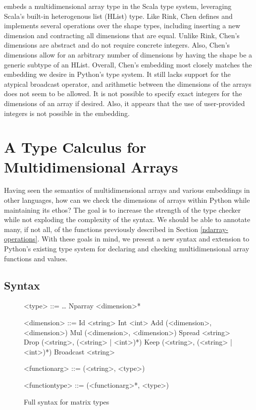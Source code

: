 \documentclass[12pt]{report}
\begin{document}
\cite{Chen2017TypesafeAF} embeds a multidimensional array type in the Scala type system, leveraging Scala's built-in heterogenous list (HList) type. Like Rink, Chen defines and implements several operations over the shape types, including inserting a new dimension and contracting all dimensions that are equal. Unlike Rink, Chen's dimensions are abstract and do not require concrete integers. Also, Chen's dimensions allow for an arbitrary number of dimensions by having the shape be a generic subtype of an HList. Overall, Chen's embedding most closely matches the embedding we desire in Python's type system. It still lacks support for the atypical broadcast operator, and arithmetic between the dimensions of the arrays does not seem to be allowed. It is not possible to specify exact integers for the dimensions of an array if desired. Also, it appears that the use of user-provided integers is not possible in the embedding.

\chapter{A Type Calculus for Multidimensional Arrays}

Having seen the semantics of multidimensional arrays and various embeddings in other languages, how can we check the dimensions of arrays within Python while maintaining its ethos? The goal is to increase the strength of the type checker while not exploding the complexity of the syntax. We should be able to annotate many, if not all, of the functions previously described in Section \ref{ndarray-operations}. With these goals in mind, we present a new syntax and extension to Python's existing type system for declaring and checking multidimensional array functions and values.

\section{Syntax}

\begin{figure}
    \centering
    \begin{grammar}
        <type> ::= \ldots
        \alt Nparray <dimension>*

        <dimension> ::= Id <string>
        \alt Int <int>
        \alt Add (<dimension>, <dimension>)
        \alt Mul (<dimension>, <dimension>)
        \alt Spread <string>
        \alt Drop (<string>, (<string> | <int>)*)
        \alt Keep (<string>, (<string> | <int>)*)
        \alt Broadcast <string>

        <functionarg> ::= (<string>, <type>)

        <functiontype> ::= (<functionarg>*, <type>)

    \end{grammar}
    \caption{Full syntax for matrix types}
    \label{syntax}
\end{figure}
\end{document}
